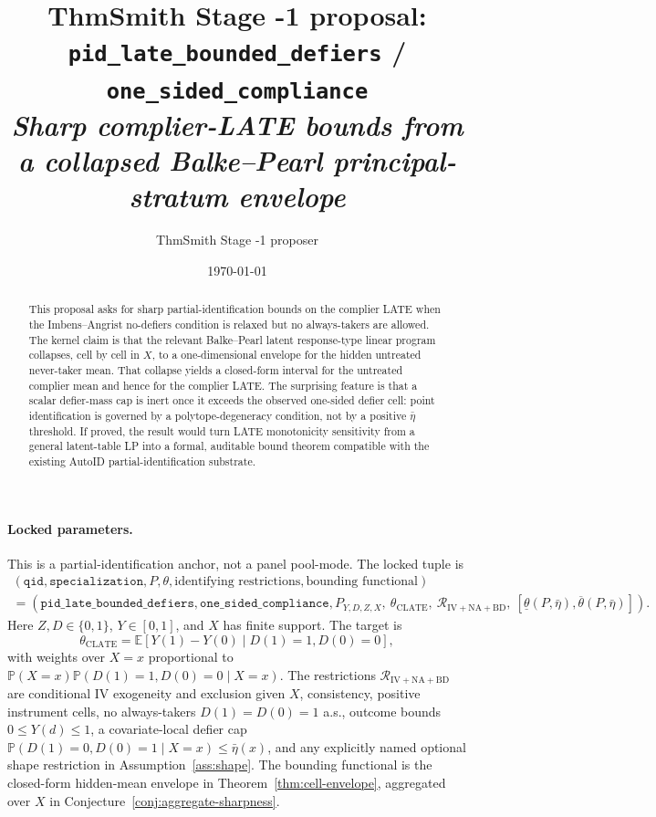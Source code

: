 \documentclass[11pt]{article}
\title{ThmSmith Stage -1 proposal: \texttt{pid\_late\_bounded\_defiers} / \texttt{one\_sided\_compliance}%
  \\ \large\textit{Sharp complier-LATE bounds from a collapsed Balke--Pearl principal-stratum envelope}}
\author{ThmSmith Stage -1 proposer}
\date{\today}
\newcommand{\E}{\mathbb{E}}
\renewcommand{\Pr}{\mathbb{P}}
\theoremstyle{definition}
\theoremstyle{plain}
\theoremstyle{remark}
\begin{document}
\maketitle


\paragraph{Locked parameters.}
This is a partial-identification anchor, not a panel pool-mode.  The locked tuple is
\[
\begin{gathered}
(\texttt{qid},\texttt{specialization},P,\theta,\text{identifying restrictions},
  \text{bounding functional})\\
=
(\texttt{pid\_late\_bounded\_defiers},\texttt{one\_sided\_compliance},
  P_{Y,D,Z,X},\ \theta_{\mathrm{CLATE}},\
  \mathcal{R}_{\mathrm{IV+NA+BD}},\
  [\underline\theta(P,\bar\eta),\overline\theta(P,\bar\eta)]) .
\end{gathered}
\]
Here \(Z,D\in\{0,1\}\), \(Y\in[0,1]\), and \(X\) has finite support.  The target is
\[
\theta_{\mathrm{CLATE}}
=\E[Y(1)-Y(0)\mid D(1)=1,D(0)=0],
\]
with weights over \(X=x\) proportional to \(\Pr(X=x)\Pr(D(1)=1,D(0)=0\mid X=x)\).  The restrictions
\(\mathcal{R}_{\mathrm{IV+NA+BD}}\) are conditional IV exogeneity and exclusion given \(X\), consistency, positive instrument cells, no always-takers \(D(1)=D(0)=1\) a.s., outcome bounds \(0\le Y(d)\le 1\), a covariate-local defier cap
\(\Pr(D(1)=0,D(0)=1\mid X=x)\le\bar\eta(x)\), and any explicitly named optional shape restriction in Assumption~\ref{ass:shape}.  The bounding functional is the closed-form hidden-mean envelope in Theorem~\ref{thm:cell-envelope}, aggregated over \(X\) in Conjecture~\ref{conj:aggregate-sharpness}.

\begin{abstract}
This proposal asks for sharp partial-identification bounds on the complier LATE when the Imbens--Angrist no-defiers condition is relaxed but no always-takers are allowed.  The kernel claim is that the relevant Balke--Pearl latent response-type linear program collapses, cell by cell in \(X\), to a one-dimensional envelope for the hidden untreated never-taker mean.  That collapse yields a closed-form interval for the untreated complier mean and hence for the complier LATE.  The surprising feature is that a scalar defier-mass cap is inert once it exceeds the observed one-sided defier cell: point identification is governed by a polytope-degeneracy condition, not by a positive \(\bar\eta\) threshold.  If proved, the result would turn LATE monotonicity sensitivity from a general latent-table LP into a formal, auditable bound theorem compatible with the existing AutoID partial-identification substrate.
\end{abstract}
\end{document}
